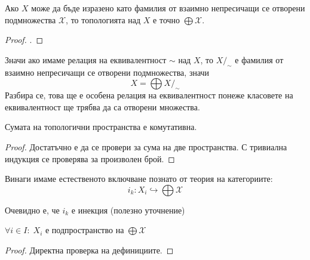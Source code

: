 \begin{proposition}
    Ако $X$ може да бъде изразено като фамилия от взаимно непресичащи се отворени подмножества $\mathcal X$, то топологията над $X$ е точно $\bigoplus \mathcal X$.
\end{proposition}
\begin{proof}
    \cite[стр.~75]{engelking1989general}.
\end{proof}
\begin{corollary}
    Значи ако имаме релация на еквивалентност $\sim$ над $X$, то $X/_\sim$ е фамилия от взаимно непресичащи се отворени подмножества, значи
    \begin{equation*}
        X = \bigoplus X/_\sim
    \end{equation*}
    Разбира се, това ще е особена релация на еквивалентност понеже класовете на еквивалентност ще трябва да са отворени множества.
\end{corollary}

\begin{proposition}
    Сумата на топологични пространства е комутативна.
\end{proposition}
\begin{proof}
    Достатъчно е да се провери за сума на две пространства. С тривиална индукция се проверява за произволен брой.
\end{proof}

\begin{notation}
    Винаги имаме естественото включване познато от теория на категориите:
    \begin{equation*}
        i_k : X_i \hookrightarrow \bigoplus \mathcal X
    \end{equation*}
\end{notation}
Очевидно е, че $i_k$ е инекция (полезно уточнение)
\begin{proposition}
    $\forall i \in I:\; X_i$ е подпространство на $\bigoplus \mathcal X$
\end{proposition}
\begin{proof}
    Директна проверка на дефинициите.
\end{proof}

